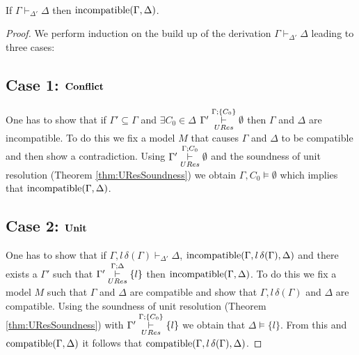 \begin{mytheorem} \hspace*{0pt} \\
\begin{center}If  $\Gamma \vdash_{\Delta'} \Delta$  then $\mathrm{incompatible}(\Gamma,\Delta)$. \end{center}
\begin{proof}
We perform induction on the build up of the derivation $\Gamma \vdash_{\Delta'} \Delta$ leading to three cases:
%
\subsection*{Case 1: $\mathbf{Conflict}$}
One has to show that if $\Gamma' \subseteq \Gamma$ and $\exists C_0 \in \Delta$ $\Gamma' \overset{\Gamma;\{ C_0 \}}{\underset{URes}{\vdash}} \emptyset$ then $\Gamma$ and $\Delta$ are incompatible. To do this we fix a model $M$ that causes $\Gamma$ and $\Delta$ to be compatible and then show a contradiction. Using $\Gamma' \overset{\Gamma;C_0}{\underset{URes}{\vdash}} \emptyset$ and the soundness of unit resolution (Theorem \ref{thm:UResSoundness}) we obtain $\Gamma, C_0 \models \emptyset$ which implies that $\mathrm{incompatible}(\Gamma,\Delta)$. 
%
\subsection*{Case 2: $\mathbf{Unit}$}
One has to show that if $\Gamma, l \, \delta(\Gamma) \vdash_{\Delta'} \Delta$, $\mathrm{incompatible}(\Gamma,l \, \delta(\Gamma),\Delta)$ and there exists a $\Gamma'$ such that  $\Gamma' \overset{\Gamma;\Delta}{\underset{URes}{\vdash}} \{ l \}$ then $\mathrm{incompatible}(\Gamma,\Delta)$. To do this we fix a model $M$ such that $\Gamma$ and $\Delta$ are compatible and show that $\Gamma, l \, \delta(\Gamma)$ and $\Delta$ are compatible. Using the soundness of unit resolution (Theorem \ref{thm:UResSoundness}) with $\Gamma' \overset{\Gamma;\{ C_0\}}{\underset{URes}{\vdash}} \{ l \}$ we obtain that $\Delta \models \{l\}$. From this and $\mathrm{compatible}(\Gamma,\Delta)$ it follows that $\mathrm{compatible}(\Gamma, l \, \delta(\Gamma),\Delta)$.



\end{proof}
\end{mytheorem}
